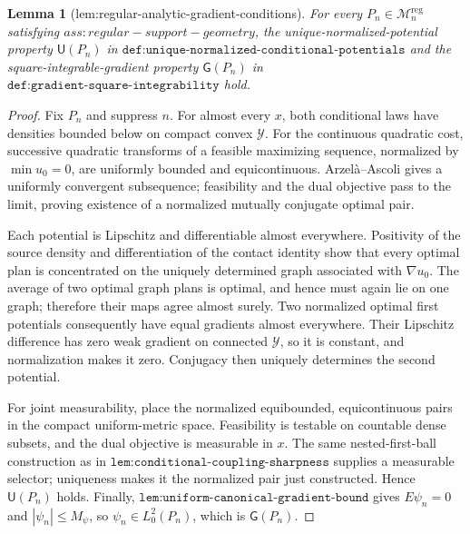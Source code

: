 \documentclass{article}
\newtheorem{lemma}{Lemma}
\begin{document}
\begin{lemma}[lem:regular-analytic-gradient-conditions]\label{lem:regular-analytic-gradient-conditions}
For every \(P_n\in\mathcal M_n^{\mathrm{reg}}\) satisfying \(ass:regular-support-geometry\), the unique-normalized-potential property \(\mathsf U(P_n)\) in \(\texttt{def:unique-normalized-conditional-potentials}\) and the square-integrable-gradient property \(\mathsf G(P_n)\) in \(\texttt{def:gradient-square-integrability}\) hold.
\end{lemma}
\begin{proof}
Fix \(P_n\) and suppress \(n\). For almost every \(x\), both conditional laws have densities bounded below on compact convex \(\mathcal Y\). For the continuous quadratic cost, successive quadratic transforms of a feasible maximizing sequence, normalized by \(\min u_0=0\), are uniformly bounded and equicontinuous. Arzel\`a--Ascoli gives a uniformly convergent subsequence; feasibility and the dual objective pass to the limit, proving existence of a normalized mutually conjugate optimal pair.

Each potential is Lipschitz and differentiable almost everywhere. Positivity of the source density and differentiation of the contact identity show that every optimal plan is concentrated on the uniquely determined graph associated with \(\nabla u_0\). The average of two optimal graph plans is optimal, and hence must again lie on one graph; therefore their maps agree almost surely. Two normalized optimal first potentials consequently have equal gradients almost everywhere. Their Lipschitz difference has zero weak gradient on connected \(\mathcal Y\), so it is constant, and normalization makes it zero. Conjugacy then uniquely determines the second potential.

For joint measurability, place the normalized equibounded, equicontinuous pairs in the compact uniform-metric space. Feasibility is testable on countable dense subsets, and the dual objective is measurable in \(x\). The same nested-first-ball construction as in \(\texttt{lem:conditional-coupling-sharpness}\) supplies a measurable selector; uniqueness makes it the normalized pair just constructed. Hence \(\mathsf U(P_n)\) holds. Finally, \(\texttt{lem:uniform-canonical-gradient-bound}\) gives \(E\psi_n=0\) and \(|\psi_n|\le M_\psi\), so \(\psi_n\in L_0^2(P_n)\), which is \(\mathsf G(P_n)\).
\end{proof}
\end{document}
